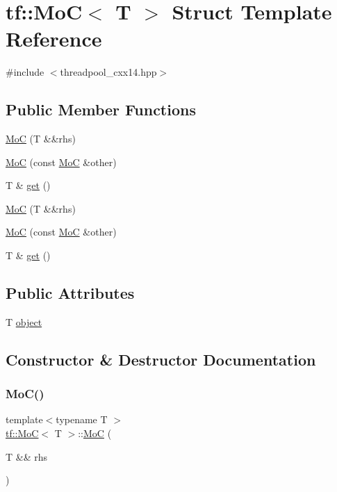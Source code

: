 \hypertarget{structtf_1_1MoC}{}\section{tf\+:\+:MoC$<$ T $>$ Struct Template Reference}
\label{structtf_1_1MoC}


{\ttfamily \#include $<$threadpool\+\_\+cxx14.\+hpp$>$}

\subsection*{Public Member Functions}
\begin{DoxyCompactItemize}
\item 
\hyperlink{structtf_1_1MoC_a38c6a89465e651e5e0e9001a9abc42b5}{MoC} (T \&\&rhs)
\item 
\hyperlink{structtf_1_1MoC_a779c86ab4750cd65cdb467065daa70f3}{MoC} (const \hyperlink{structtf_1_1MoC}{MoC} \&other)
\item 
T \& \hyperlink{structtf_1_1MoC_ab6291eb8f0d85484203bb79456ae9816}{get} ()
\item 
\hyperlink{structtf_1_1MoC_a38c6a89465e651e5e0e9001a9abc42b5}{MoC} (T \&\&rhs)
\item 
\hyperlink{structtf_1_1MoC_a779c86ab4750cd65cdb467065daa70f3}{MoC} (const \hyperlink{structtf_1_1MoC}{MoC} \&other)
\item 
T \& \hyperlink{structtf_1_1MoC_ab6291eb8f0d85484203bb79456ae9816}{get} ()
\end{DoxyCompactItemize}
\subsection*{Public Attributes}
\begin{DoxyCompactItemize}
\item 
T \hyperlink{structtf_1_1MoC_a6638e1dc2bd032df12bb48584eabe71e}{object}
\end{DoxyCompactItemize}


\subsection{Constructor \& Destructor Documentation}
\mbox{\label{structtf_1_1MoC_a38c6a89465e651e5e0e9001a9abc42b5}} 
\subsubsection{\texorpdfstring{Mo\+C()}{MoC()}\hspace{0.1cm}{\footnotesize\ttfamily [1/4]}}
{\footnotesize\ttfamily template$<$typename T $>$ \\
\hyperlink{structtf_1_1MoC}{tf\+::\+MoC}$<$ T $>$\+::\hyperlink{structtf_1_1MoC}{MoC} (\begin{DoxyParamCaption}\item[{T \&\&}]{rhs }\end{DoxyParamCaption})\hspace{0.3cm}{\ttfamily [inline]}}

